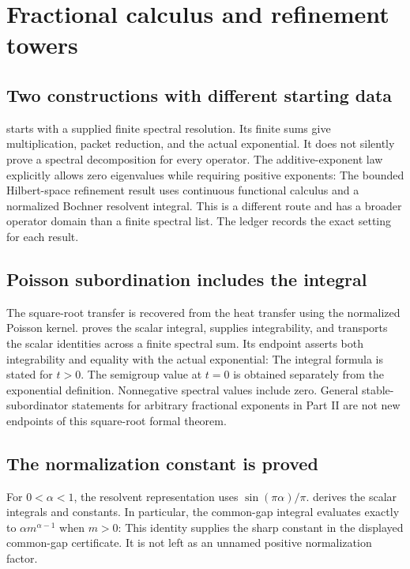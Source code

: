 \clearpage\section{Fractional calculus and refinement towers}
\label{sec:fractional}
\subsection{Two constructions with different starting data}
 starts with a supplied finite spectral resolution. Its finite sums give multiplication, packet reduction, and the actual exponential. It does not silently prove a spectral decomposition for every operator. The additive-exponent law explicitly allows zero eigenvalues while requiring positive exponents:
The bounded Hilbert-space refinement result uses continuous functional calculus and a normalized Bochner resolvent integral. This is a different route and has a broader operator domain than a finite spectral list. The ledger records the exact setting for each result.

\subsection{Poisson subordination includes the integral}
The square-root transfer is recovered from the heat transfer using the normalized Poisson kernel.  proves the scalar integral,  supplies integrability, and  transports the scalar identities across a finite spectral sum. Its endpoint asserts both integrability and equality with the actual exponential:
The integral formula is stated for $t>0$. The semigroup value at $t=0$ is obtained separately from the exponential definition. Nonnegative spectral values include zero. General stable-subordinator statements for arbitrary fractional exponents in Part II are not new endpoints of this square-root formal theorem.

\subsection{The normalization constant is proved}
For $0<\alpha<1$, the resolvent representation uses $\sin(\pi\alpha)/\pi$.  derives the scalar integrals and constants. In particular, the common-gap integral evaluates exactly to $\alpha m^{\alpha-1}$ when $m>0$:
This identity supplies the sharp constant in the displayed common-gap certificate. It is not left as an unnamed positive normalization factor.

